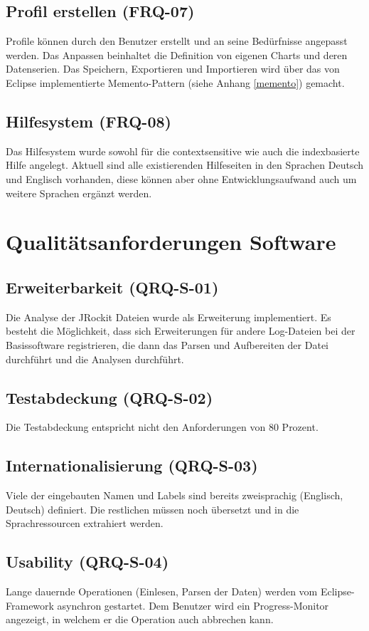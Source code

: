 \subsection{Profil erstellen (FRQ-07)}
Profile können durch den Benutzer erstellt und an seine Bedürfnisse angepasst werden. Das Anpassen beinhaltet die Definition von eigenen Charts und deren Datenserien. Das Speichern, Exportieren und Importieren wird über das von Eclipse implementierte Memento-Pattern (siehe Anhang \ref{memento}) gemacht.

\subsection{Hilfesystem (FRQ-08)}
Das Hilfesystem wurde sowohl für die contextsensitive wie auch die indexbasierte Hilfe angelegt. Aktuell sind alle existierenden Hilfeseiten in den Sprachen Deutsch und Englisch vorhanden, diese können aber ohne Entwicklungsaufwand auch um weitere Sprachen ergänzt werden. 

\section{Qualitätsanforderungen Software}
\subsection{Erweiterbarkeit (QRQ-S-01)}
Die Analyse der JRockit Dateien wurde als Erweiterung implementiert. Es besteht die Möglichkeit, dass sich Erweiterungen für andere Log-Dateien bei der Basissoftware registrieren, die dann das Parsen und Aufbereiten der Datei durchführt und die Analysen durchführt.

\subsection{Testabdeckung (QRQ-S-02)}
Die Testabdeckung entspricht nicht den Anforderungen von 80 Prozent. 

\subsection{Internationalisierung (QRQ-S-03)}
Viele der eingebauten Namen und Labels sind bereits zweisprachig (Englisch, Deutsch) definiert. Die restlichen müssen noch übersetzt und in die Sprachressourcen extrahiert werden.

\subsection{Usability (QRQ-S-04)}
Lange dauernde Operationen (Einlesen, Parsen der Daten) werden vom Eclipse-Framework asynchron gestartet. Dem Benutzer wird ein Progress-Monitor angezeigt, in welchem er die Operation auch abbrechen kann.

